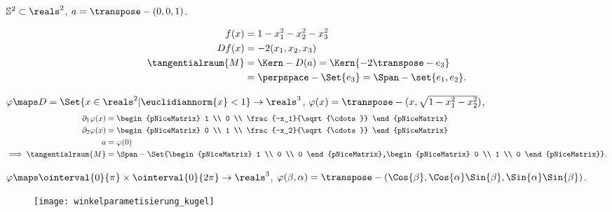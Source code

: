 \begin{beispiel*}
  \( \mathbb{S}^2\subset \reals^2 \), \( a=\transpose-{(0,0,1)} \).
  \begin{eigenschaftenenumerate}
    \item
    \begin{align*}
      f(x)&=1-x_1^2-x_2^2-x_3^2\\
      Df(x)&=-2(x_1,x_2,x_3)\\
      \tangentialraum{M}&=\Kern-{D(a)}=\Kern{-2\transpose-{e_3}}\\
      &=\perpspace-{\Set{e_3}}=\Span-{\set{e_1,e_2}}.
    \end{align*}
    \item \( \varphi\maps D=\Set{x\in \reals^2|\euclidiannorm{x}<1} \to \reals^3\), \( \varphi(x)=\transpose-{(x,\sqrt{1-x_1^2-x_2^2})} \),
    \begin{align*}
      \partial_1 \varphi(x)&=\begin{pNiceMatrix} 1 \\ 0 \\ \frac{-x_1}{\sqrt{\cdots}} \end{pNiceMatrix}\\
      \partial_2 \varphi(x)&=\begin{pNiceMatrix} 0 \\ 1 \\ \frac{-x_2}{\sqrt{\cdots}} \end{pNiceMatrix}\\
      a&= \varphi(0)\\
      \implies \tangentialraum{M}&=\Span-{\Set{\begin{pNiceMatrix} 1 \\ 0 \\ 0 \end{pNiceMatrix},\begin{pNiceMatrix} 0 \\ 1 \\ 0 \end{pNiceMatrix}}}.
    \end{align*}
    \item \( \varphi\maps \ointerval{0}{\pi}\times\ointerval{0}{2\pi} \to \reals^3\), \( \varphi(\beta,\alpha)=\transpose-{(\Cos{\beta},\Cos{\alpha}\Sin{\beta},\Sin{\alpha}\Sin{\beta})} \). 
    \begin{figure}[H]
      \centering
      \texttt{[image: winkelparametisierung\_kugel]}
      \label{fig:winkelparametisierung_kugel}
    \end{figure}

\end{eigenschaftenenumerate}
\end{beispiel*}
